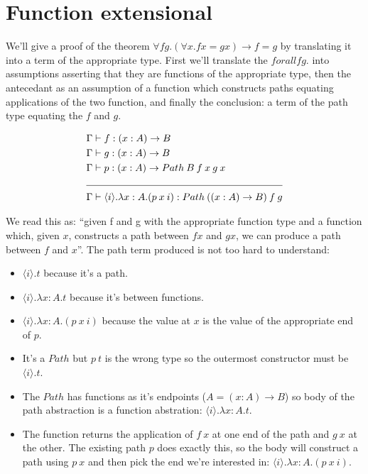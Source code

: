\documentclass[a4paper]{article}
\newcommand{\fun}[3]{(#1 : #2) \rightarrow #3}
\newcommand{\labs}[3]{\lambda #1 : #2. #3}
\newcommand{\lapp}[2]{#1 \: #2}
\newcommand{\pabs}[2]{{\langle #1 \rangle}.{#2}}
\newcommand{\papp}[2]{(#1 \: #2)}
\newcommand{\Path}[3]{{Path\:{#1}\:{#2}\:{#3}}}
\begin{document}
\section{Function extensional}

We'll give a proof of the theorem $\forall f g. (\forall x. f x = g x)
\rightarrow f = g$ by translating it into a term of the appropriate
type. First we'll translate the $forall f g.$ into assumptions
asserting that they are functions of the appropriate type, then the
antecedant as an assumption of a function which constructs paths
equating applications of the two function, and finally the conclusion:
a term of the path type equating the $f$ and $g$.

\begin{align}
  \Gamma &\vdash f : \fun{x}{A}{B} \\
  \Gamma &\vdash g : \fun{x}{A}{B} \\
  \Gamma &\vdash p : \fun{x}{A}{\Path{B}{\lapp{f}{x}}{\lapp{g}{x}}} \\
  \cline{1-2}
  \Gamma &\vdash \pabs{i}{\labs{x}{A}{
      \papp{\lapp{p}{x}}{i}
  }} : \Path{(\fun{x}{A}{B})}{f}{g}
\end{align}

We read this as: ``given f and g with the appropriate function type
and a function which, given $x$, constructs a path between $f x$ and
$g x$, we can produce a path between $f$ and $x$''. The path term
produced is not too hard to understand:

\begin{itemize}
  \item $\pabs{i}{t}$ because it's a path.
  \item $\pabs{i}{\labs{x}{A}{t}}$ because it's between functions.
  \item $\pabs{i}{\labs{x}{A}{\papp{\lapp{p}{x}}{i}}}$ because the value
    at $x$ is the value of the appropriate end of $p$.
\end{itemize}

\begin{itemize}
  \item It's a $Path$ but $\lapp{p}{t}$ is the wrong type so the
    outermost constructor must be $\pabs{i}{t}$.
  \item The $Path$ has functions as it's endpoints ($A =
    \fun{x}{A}{B}$) so body of the path abstraction is a function
    abstration: $\pabs{i}{\labs{x}{A}{t}}$.
  \item The function returns the application of $\lapp{f}{x}$ at one
    end of the path and $\lapp{g}{x}$ at the other. The existing path
    $p$ does exactly this, so the body will construct a path using
    $\lapp{p}{x}$ and then pick the end we're interested in:
    $\pabs{i}{\labs{x}{A}{\papp{\lapp{p}{x}}{i}}}$.
\end{itemize}
\end{document}

